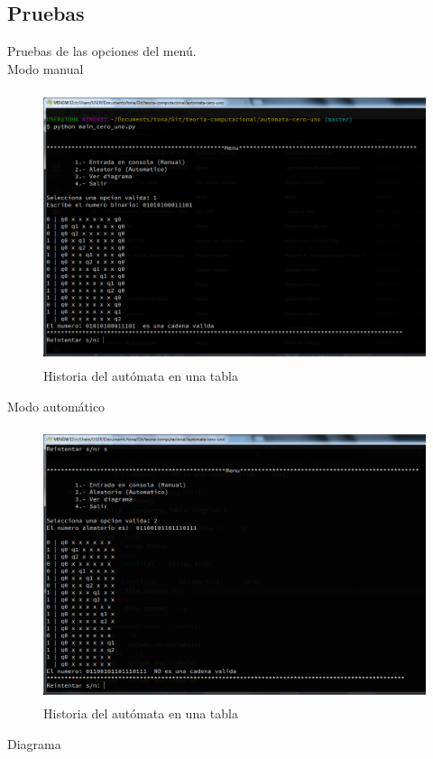 	\subsection{Pruebas}
	Pruebas de las opciones del menú.
	\\{\large Modo manual}
	\begin{figure}[H]
		\begin{center}
			\includegraphics[width=\linewidth, height=8cm]{img/cero-uno-manual.png}
			\caption{Historia del autómata en una tabla}
			\label{fig:cero-uno1}
		\end{center}
	\end{figure}
	{\large Modo automático}
	\begin{figure}[H]
		\begin{center}
			\includegraphics[width=\linewidth, height=8cm]{img/cero-uno-automatico.png}
			\caption{Historia del autómata en una tabla}
			\label{fig:cero-uno2}
		\end{center}
	\end{figure}
	{\large Diagrama}
